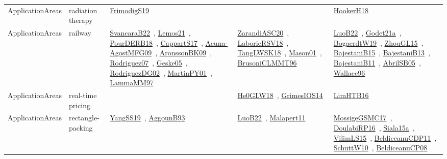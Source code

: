 {\begin{longtable}{lp{3cm}>{\raggedright\arraybackslash}p{6cm}>{\raggedright\arraybackslash}p{6cm}>{\raggedright\arraybackslash}p{8cm}}
ApplicationAreas & radiation therapy & \href{works/FrimodigS19.pdf}{FrimodigS19}~\cite{FrimodigS19} &  & \href{works/HookerH18.pdf}{HookerH18}~\cite{HookerH18}\\
ApplicationAreas & railway & \href{works/SvancaraB22.pdf}{SvancaraB22}~\cite{SvancaraB22}, \href{works/Lemos21.pdf}{Lemos21}~\cite{Lemos21}, \href{works/PourDERB18.pdf}{PourDERB18}~\cite{PourDERB18}, \href{works/CappartS17.pdf}{CappartS17}~\cite{CappartS17}, \href{works/Acuna-AgostMFG09.pdf}{Acuna-AgostMFG09}~\cite{Acuna-AgostMFG09}, \href{works/AronssonBK09.pdf}{AronssonBK09}~\cite{AronssonBK09}, \href{works/Rodriguez07.pdf}{Rodriguez07}~\cite{Rodriguez07}, \href{works/Geske05.pdf}{Geske05}~\cite{Geske05}, \href{works/RodriguezDG02.pdf}{RodriguezDG02}~\cite{RodriguezDG02}, \href{works/MartinPY01.pdf}{MartinPY01}~\cite{MartinPY01}, \href{works/LammaMM97.pdf}{LammaMM97}~\cite{LammaMM97} & \href{works/ZarandiASC20.pdf}{ZarandiASC20}~\cite{ZarandiASC20}, \href{works/LaborieRSV18.pdf}{LaborieRSV18}~\cite{LaborieRSV18}, \href{works/TangLWSK18.pdf}{TangLWSK18}~\cite{TangLWSK18}, \href{works/Mason01.pdf}{Mason01}~\cite{Mason01}, \href{works/BrusoniCLMMT96.pdf}{BrusoniCLMMT96}~\cite{BrusoniCLMMT96} & \href{works/LuoB22.pdf}{LuoB22}~\cite{LuoB22}, \href{works/Godet21a.pdf}{Godet21a}~\cite{Godet21a}, \href{works/BogaerdtW19.pdf}{BogaerdtW19}~\cite{BogaerdtW19}, \href{works/ZhouGL15.pdf}{ZhouGL15}~\cite{ZhouGL15}, \href{works/BajestaniB15.pdf}{BajestaniB15}~\cite{BajestaniB15}, \href{works/BajestaniB13.pdf}{BajestaniB13}~\cite{BajestaniB13}, \href{works/BajestaniB11.pdf}{BajestaniB11}~\cite{BajestaniB11}, \href{works/AbrilSB05.pdf}{AbrilSB05}~\cite{AbrilSB05}, \href{works/Wallace96.pdf}{Wallace96}~\cite{Wallace96}\\
ApplicationAreas & real-time pricing &  & \href{works/He0GLW18.pdf}{He0GLW18}~\cite{He0GLW18}, \href{works/GrimesIOS14.pdf}{GrimesIOS14}~\cite{GrimesIOS14} & \href{works/LimHTB16.pdf}{LimHTB16}~\cite{LimHTB16}\\
ApplicationAreas & rectangle-packing & \href{works/YangSS19.pdf}{YangSS19}~\cite{YangSS19}, \href{works/AggounB93.pdf}{AggounB93}~\cite{AggounB93} & \href{works/LuoB22.pdf}{LuoB22}~\cite{LuoB22}, \href{works/Malapert11.pdf}{Malapert11}~\cite{Malapert11} & \href{works/MossigeGSMC17.pdf}{MossigeGSMC17}~\cite{MossigeGSMC17}, \href{works/DoulabiRP16.pdf}{DoulabiRP16}~\cite{DoulabiRP16}, \href{works/Siala15a.pdf}{Siala15a}~\cite{Siala15a}, \href{works/VilimLS15.pdf}{VilimLS15}~\cite{VilimLS15}, \href{works/BeldiceanuCDP11.pdf}{BeldiceanuCDP11}~\cite{BeldiceanuCDP11}, \href{works/SchuttW10.pdf}{SchuttW10}~\cite{SchuttW10}, \href{works/BeldiceanuCP08.pdf}{BeldiceanuCP08}~\cite{BeldiceanuCP08}\\

\end{longtable}}
